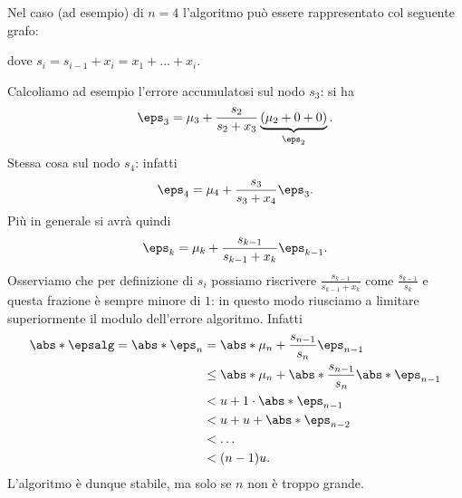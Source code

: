 Nel caso (ad esempio) di $n = 4$ l'algoritmo può essere rappresentato col seguente grafo:    
    \begin{center}
    \end{center}
dove $s_i = s_{i-1} + x_i = x_1 + \dots + x_i$. 

Calcoliamo ad esempio l'errore accumulatosi sul nodo $s_3$: si ha \[
    \eps_3 = \mu_3 + \frac{s_2}{s_2 + x_3}\underbrace{(\mu_2 + 0 + 0)}_{\eps_2}.
\] Stessa cosa sul nodo $s_4$: infatti \[
    \eps_4 = \mu_4 + \frac{s_3}{s_3 + x_4}\eps_3.
\] Più in generale si avrà quindi \[
    \eps_k = \mu_k + \frac{s_{k-1}}{s_{k-1}+ x_k}\eps_{k-1}.
\] Osserviamo che per definizione di $s_i$ possiamo riscrivere $\frac{s_{k-1}}{s_{k-1} + x_k}$ come $\frac{s_{k-1}}{s_k}$ e questa frazione è sempre minore di $1$: in questo modo riusciamo a limitare superiormente il modulo dell'errore algoritmo. Infatti \begin{align*}
    \abs*{\epsalg} = \abs*{\eps_n} &= \abs*{\mu_n + \frac{s_{n-1}}{s_n}\eps_{n-1}}\\
    &\leq \abs*{\mu_n} + \abs*{\frac{s_{n-1}}{s_n}}\abs*{\eps_{n-1}}\\
    &< u + 1 \cdot \abs*{\eps_{n-1}} \\
    &< u + u + \abs*{\eps_{n-2}} \\
    &< \dots \\
    &< (n-1)u. 
\end{align*}  L'algoritmo è dunque stabile, ma solo se $n$ non è troppo grande.